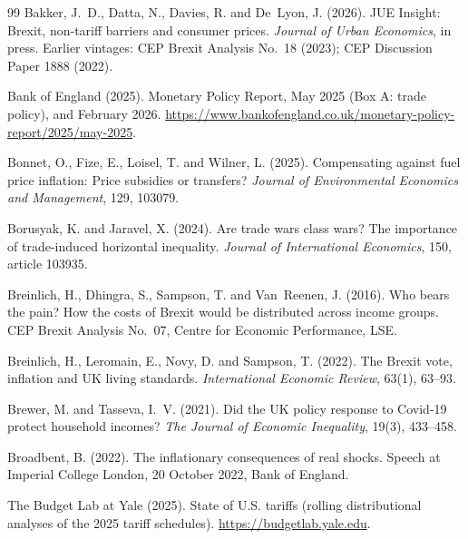 \begin{thebibliography}{99}
Bakker, J.~D., Datta, N., Davies, R. and De~Lyon, J. (2026).
\newblock JUE Insight: Brexit, non-tariff barriers and consumer prices.
\newblock \emph{Journal of Urban Economics}, in press. Earlier vintages: CEP Brexit Analysis No.~18 (2023); CEP Discussion Paper 1888 (2022).

Bank of England (2025).
\newblock Monetary Policy Report, May 2025 (Box A: trade policy), and February 2026.
\newblock \url{https://www.bankofengland.co.uk/monetary-policy-report/2025/may-2025}.

Bonnet, O., Fize, E., Loisel, T. and Wilner, L. (2025).
\newblock Compensating against fuel price inflation: Price subsidies or transfers?
\newblock \emph{Journal of Environmental Economics and Management}, 129, 103079.

Borusyak, K. and Jaravel, X. (2024).
\newblock Are trade wars class wars? The importance of trade-induced horizontal inequality.
\newblock \emph{Journal of International Economics}, 150, article 103935.

Breinlich, H., Dhingra, S., Sampson, T. and Van~Reenen, J. (2016).
\newblock Who bears the pain? How the costs of Brexit would be distributed across income groups.
\newblock CEP Brexit Analysis No.~07, Centre for Economic Performance, LSE.

Breinlich, H., Leromain, E., Novy, D. and Sampson, T. (2022).
\newblock The Brexit vote, inflation and UK living standards.
\newblock \emph{International Economic Review}, 63(1), 63--93.

Brewer, M. and Tasseva, I.~V. (2021).
\newblock Did the UK policy response to Covid-19 protect household incomes?
\newblock \emph{The Journal of Economic Inequality}, 19(3), 433--458.

Broadbent, B. (2022).
\newblock The inflationary consequences of real shocks.
\newblock Speech at Imperial College London, 20 October 2022, Bank of England.

The Budget Lab at Yale (2025).
\newblock State of U.S. tariffs (rolling distributional analyses of the 2025 tariff schedules).
\newblock \url{https://budgetlab.yale.edu}.


\end{thebibliography}
